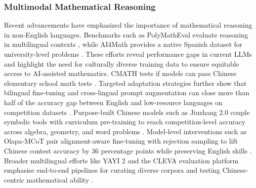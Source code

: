 \documentclass[acmsmall,anonymous]{acmart}
\begin{document}
\subsubsection{Multimodal Mathematical Reasoning}\label{sec:multilingual}
Recent advancements have emphasized the importance of mathematical reasoning in non-English languages. Benchmarks such as PolyMathEval evaluate reasoning in multilingual contexts \cite{anonymous2025polymatheval,anonymous2025polymatheval}, while AI4Math provides a native Spanish dataset for university-level problems \cite{perez2025ai4mathnativespanishbenchmark}. These efforts reveal performance gaps in current LLMs and highlight the need for culturally diverse training data to ensure equitable access to AI-assisted mathematics. CMATH tests if models can pass Chinese elementary school math tests \cite{wei2023cmath}. Targeted adaptation strategies further show that bilingual fine-tuning and cross-lingual prompt augmentation can close more than half of the accuracy gap between English and low-resource languages on competition datasets \cite{chen-2024-multilingual-math}.  Purpose-built Chinese models such as Jiuzhang 2.0 couple symbolic tools with curriculum pre-training to reach competition-level accuracy across algebra, geometry, and word problems \cite{sun-2023-jiuzhang}.  Model-level interventions such as Olapa-MCoT pair alignment-aware fine-tuning with rejection sampling to lift Chinese contest accuracy by 36 percentage points while preserving English skills \cite{zhu-2023-olapa-mcot}.  Broader multilingual efforts like YAYI 2 and the CLEVA evaluation platform emphasise end-to-end pipelines for curating diverse corpora and testing Chinese-centric mathematical ability \cite{luo2023yayi2multilingualopensource,li2023clevachineselanguagemodels}.
\end{document}
